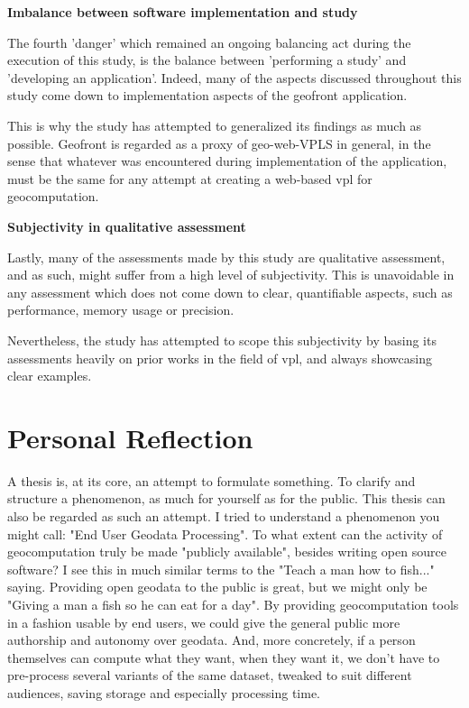\textbf{Imbalance between software implementation and study}

The fourth 'danger' which remained an ongoing balancing act during the execution of this study, is the balance between 'performing a study' and 'developing an application'. 
Indeed, many of the aspects discussed throughout this study come down to implementation aspects of the geofront application. 

This is why the study has attempted to generalized its findings as much as possible.
Geofront is regarded as a proxy of geo-web-VPLS in general, in the sense that whatever was encountered during implementation of the application, must be the same for any attempt at creating a web-based vpl for geocomputation.


\textbf{Subjectivity in qualitative assessment}

Lastly, many of the assessments made by this study are qualitative assessment, and as such, might suffer from a high level of subjectivity. 
This is unavoidable in any assessment which does not come down to clear, quantifiable aspects, such as performance, memory usage or precision. 

Nevertheless, the study has attempted to scope this subjectivity by basing its assessments heavily on prior works in the field of vpl, and always showcasing clear examples. 

\newpage

\section{Personal Reflection}
A thesis is, at its core, an attempt to formulate something. 
To clarify and structure a phenomenon, as much for yourself as for the public. 
This thesis can also be regarded as such an attempt. 
I tried to understand a phenomenon you might call: "End User Geodata Processing". 
To what extent can the activity of geocomputation truly be made "publicly available", besides writing open source software?
I see this in much similar terms to the "Teach a man how to fish..." saying.
Providing open geodata to the public is great, but we might only be "Giving a man a fish so he can eat for a day".
By providing geocomputation tools in a fashion usable by end users, we could give the general public more authorship and autonomy over geodata. 
And, more concretely, if a person themselves can compute what they want, when they want it, we don't have to pre-process several variants of the same dataset, tweaked to suit different audiences, saving storage and especially processing time.

